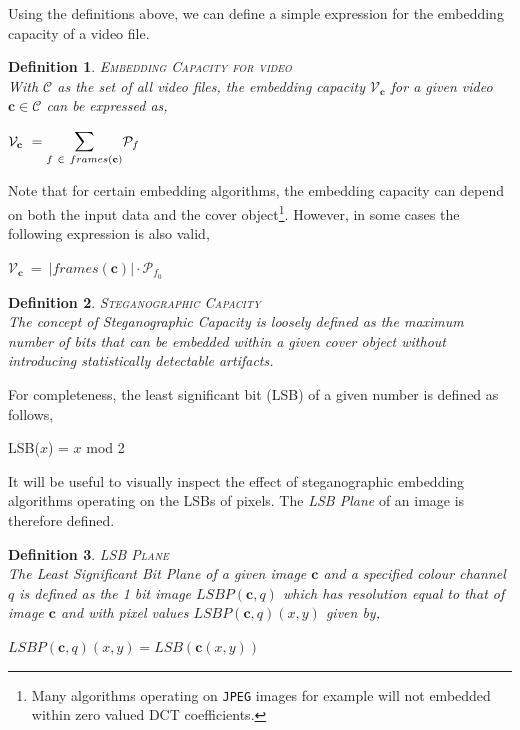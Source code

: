 \documentclass[paper=a4, fontsize=11pt,twoside]{scrartcl}
\numberwithin{table}{section}
\numberwithin{figure}{section}
\numberwithin{algorithm}{section}
\newtheorem{ddef}{Definition}[section]
\begin{document}
Using the definitions above, we can define a simple expression for the embedding capacity of a video file. 
\begin{ddef}
\textsc{Embedding Capacity for video}\\[5pt]
With $\mathcal{C}$ as the set of all video files, the embedding capacity $\mathcal{V} _{\textbf{c}}$ for a given video $\textbf{c} \in \mathcal{C}$ can be expressed as,
\begin{center}
	$\mathcal{V} _{\textbf{c}} ~= \mathlarger{\mathlarger{\sum}}\limits_{f ~\in ~frames(\textbf{c})} \mathcal{P} _{f}$
\end{center}
\end{ddef}
\noindent
Note that for certain embedding algorithms, the embedding capacity can depend on both the input data and the cover object\footnote{Many algorithms operating on \texttt{JPEG} images for example will not embedded within zero valued DCT coefficients.}. However, in some cases the following expression is also valid,
\begin{center}
	$\mathcal{V} _{\textbf{c}} ~=~ |frames(\textbf{c})| \cdot \mathcal{P} _{f _{0}}$
\end{center}

\begin{ddef}
\textsc{Steganographic Capacity}\\[5pt]
The concept of Steganographic Capacity is loosely defined as the maximum number of bits that can be embedded within a given cover object without introducing statistically detectable artifacts. %
\end{ddef}
\noindent
For completeness, the least significant bit (LSB) of a given number is defined as follows,
\begin{center}
	LSB($x$) = $x$ mod 2
\end{center}

\noindent
It will be useful to visually inspect the effect of steganographic embedding algorithms operating on the LSBs of pixels. The \textit{LSB Plane} of an image is therefore defined.

\begin{ddef}
\textsc{LSB Plane}\\[5pt]
The Least Significant Bit Plane of a given image $\mathcal{\textbf{c}}$ and a specified colour channel $q$ is defined as the 1 bit image $LSBP(\mathcal{\textbf{c}},q)$ which has resolution equal to that of image $\mathcal{\textbf{c}}$ and with pixel values  $LSBP(\mathcal{\textbf{c}},q)(x,y)$ given by,
\begin{center}
	$LSBP(\mathcal{\textbf{c}},q)(x,y) = LSB(\mathcal{\textbf{c}}(x,y))$
\end{center} 
\end{ddef}
\end{document}
